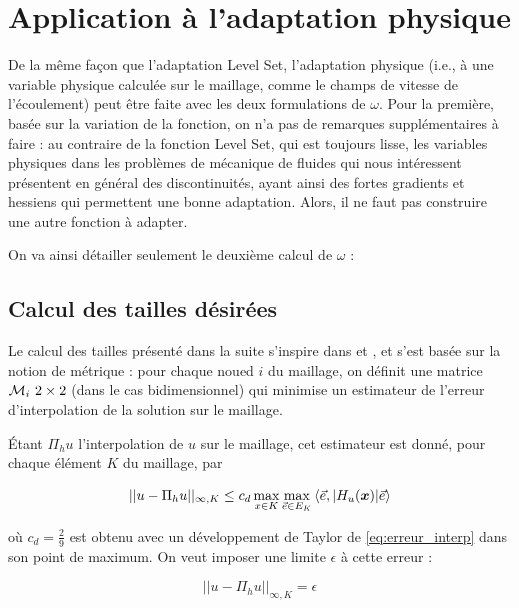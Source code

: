 
\section{Application à l'adaptation physique}
\label{sec:adapPhysique}

\indent De la même façon que l'adaptation Level Set, l'adaptation physique (i.e., à une variable physique calculée sur le maillage, comme le champs de vitesse de l'écoulement) peut être faite avec les deux formulations de \(\omega\). Pour la première, basée sur la variation de la fonction, on n'a pas de remarques supplémentaires à faire : au contraire de la fonction Level Set, qui est toujours lisse, les variables physiques dans les problèmes de mécanique de fluides qui nous intéressent présentent en général des discontinuités, ayant ainsi des fortes gradients et hessiens qui permettent une bonne adaptation. Alors, il ne faut pas construire une autre fonction à adapter. 

\indent On va ainsi détailler seulement le deuxième calcul de \(\omega\) :

\subsection{Calcul des tailles désirées}

\indent Le calcul des tailles présenté dans la suite s'inspire dans \cite{cecile_these} et \cite{frey_alauzet}, et s'est basée sur la notion de métrique : pour chaque noued \(i\) du maillage, on définit une matrice \(\met_i \ 2 \times 2\) (dans le cas bidimensionnel) qui minimise un estimateur de l'erreur d'interpolation de la solution sur le maillage.

\indent Étant \(\Pi_hu\) l'interpolation de \(u\) sur le maillage, cet estimateur est donné, pour chaque élément \(K\) du maillage, par

\begin{equation}
	\label{eq:erreur_interp}
	||u-\Pi_hu||_{\infty,K} \leq c_d \max_{x \in K}{\max_{\vec{e} \in E_K}{\langle \vec{e}, |H_u(\boldsymbol{x})| \vec{e} \rangle}}
\end{equation}

\noindent où \(c_d = \frac{2}{9}\) est obtenu avec un développement de Taylor de \eqref{eq:erreur_interp} dans son point de maximum. On veut imposer une  limite \(\epsilon\) à cette erreur : 

\begin{equation*}
	||u-\Pi_hu||_{\infty,K} = \epsilon
\end{equation*}

